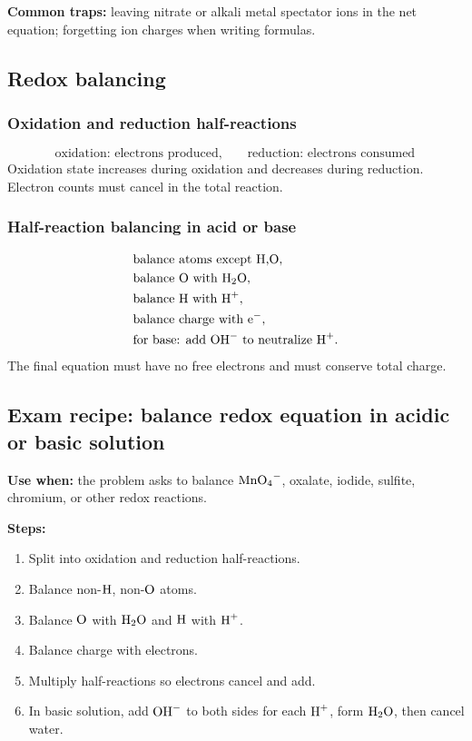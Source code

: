 \textbf{Common traps:} leaving nitrate or alkali metal spectator ions in the net equation; forgetting ion charges when writing formulas.

\subsection{Redox balancing}

\subsubsection{Oxidation and reduction half-reactions}
\[
\text{oxidation: electrons produced}, \qquad
\text{reduction: electrons consumed}
\]
Oxidation state increases during oxidation and decreases during reduction. Electron counts must cancel in the total reaction.

\subsubsection{Half-reaction balancing in acid or base}
\[
\begin{aligned}
&\text{balance atoms except H,O},\\
&\text{balance O with }\ce{H2O},\\
&\text{balance H with }\ce{H+},\\
&\text{balance charge with }\ce{e-},\\
&\text{for base: add }\ce{OH-}\text{ to neutralize }\ce{H+}.
\end{aligned}
\]
The final equation must have no free electrons and must conserve total charge.

\subsection{Exam recipe: balance redox equation in acidic or basic solution}
\textbf{Use when:} the problem asks to balance \(\ce{MnO4-}\), oxalate, iodide, sulfite, chromium, or other redox reactions.

\textbf{Steps:}
\begin{enumerate}
    \item Split into oxidation and reduction half-reactions.
    \item Balance non-\(\ce{H}\), non-\(\ce{O}\) atoms.
    \item Balance \(\ce{O}\) with \(\ce{H2O}\) and \(\ce{H}\) with \(\ce{H+}\).
    \item Balance charge with electrons.
    \item Multiply half-reactions so electrons cancel and add.
    \item In basic solution, add \(\ce{OH-}\) to both sides for each \(\ce{H+}\), form \(\ce{H2O}\), then cancel water.
\end{enumerate}

